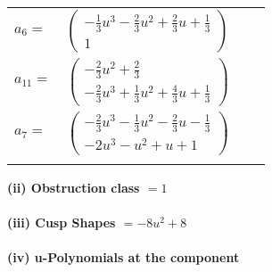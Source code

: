 \documentclass[1p]{elsarticle_modified}
\theoremstyle{definition}
\begin{document}
\begin{tabular}{m{7pt} m{180pt} m{7pt} m{180pt} }
\flushright $a_{6}=$&$\begin{pmatrix}-\frac{1}{3} u^3-\frac{2}{3} u^2+\frac{2}{3} u+\frac{1}{3}\\1\end{pmatrix}$ \\
\flushright $a_{11}=$&$\begin{pmatrix}-\frac{2}{3} u^2+\frac{2}{3}\\-\frac{2}{3} u^3+\frac{1}{3} u^2+\frac{4}{3} u+\frac{1}{3}\end{pmatrix}$ \\
\flushright $a_{7}=$&$\begin{pmatrix}-\frac{2}{3} u^3-\frac{1}{3} u^2-\frac{2}{3} u-\frac{1}{3}\\-2 u^3- u^2+u+1\end{pmatrix}$\\&\end{tabular}
\flushleft \textbf{(ii) Obstruction class $= 1$}\\~\\
\flushleft \textbf{(iii) Cusp Shapes $= -8 u^2+8$}\\~\\
\newpage\renewcommand{\arraystretch}{1}
\flushleft \textbf{(iv) u-Polynomials at the component}\newline \\
\end{document}
